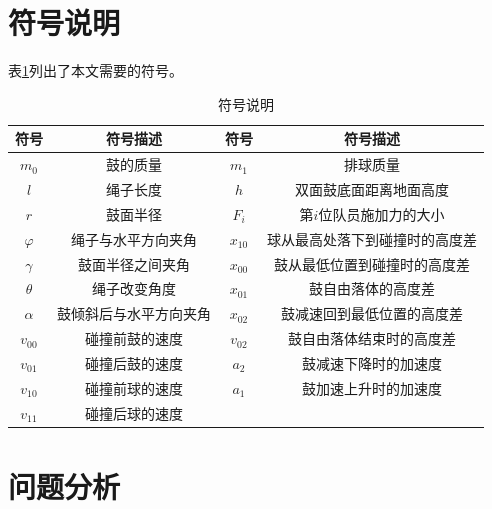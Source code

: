 \documentclass{cumcm}
\begin{document}
\newpage
\section{符号说明}
表\ref{table-symbol}列出了本文需要的符号。
\begin{table}[H]
  \centering
  \caption{符号说明}\label{table-symbol}
  \begin{tabular*}{\textwidth}{c|c|c|c}
  \hline
  符号 & 符号描述 & 符号 & 符号描述\\
  \hline
  $m_0$ & 鼓的质量 &  $m_1$ & 排球质量 \\ 
  $l$ & 绳子长度 &  $h$ & 双面鼓底面距离地面高度\\
  $r$ & 鼓面半径 & $F_{i}$ & 第$i$位队员施加力的大小\\
  $\varphi$ & 绳子与水平方向夹角 & $x_{10}$ & 球从最高处落下到碰撞时的高度差\\
  $\gamma$ & 鼓面半径之间夹角 &  $x_{00}$ & 鼓从最低位置到碰撞时的高度差\\
  $\theta$ & 绳子改变角度  & $x_{01}$ & 鼓自由落体的高度差 \\
  $\alpha$ & 鼓倾斜后与水平方向夹角 & $x_{02}$ & 鼓减速回到最低位置的高度差\\
  $v_{00}$ & 碰撞前鼓的速度 &  $v_{02}$ & 鼓自由落体结束时的高度差\\
  $v_{01}$ & 碰撞后鼓的速度 &  $a_2$ & 鼓减速下降时的加速度\\
  $v_{10}$ & 碰撞前球的速度 &  $a_1$ & 鼓加速上升时的加速度\\
  $v_{11}$ & 碰撞后球的速度 & \\
  \hline
  \end{tabular*}
\end{table}


\section{问题分析}
\end{document}
